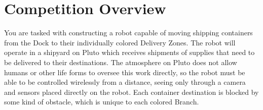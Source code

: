 \section{Competition Overview}

You are tasked with constructing a robot capable of moving shipping containers from the Dock to their individually colored Delivery Zones. The robot will operate in a shipyard on Pluto which receives shipments of supplies that need to be delivered to their destinations. The atmosphere on Pluto does not allow humans or other life forms to oversee this work directly, so the robot must be able to be controlled wirelessly from a distance, seeing only through a camera and sensors placed directly on the robot. Each container destination is blocked by some kind of obstacle, which is unique to each colored Branch. 
